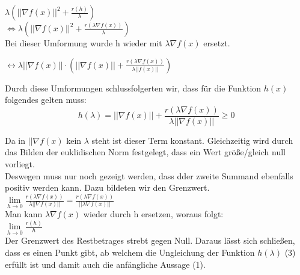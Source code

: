 $\lambda (||\nabla f(x)||^2 + \frac{r(h)}{\lambda})$ \\

$\Leftrightarrow \lambda(||\nabla f(x)||^2 + \frac{r(\lambda \nabla f(x))}{\lambda})$ \\

Bei dieser Umformung wurde h wieder mit $\lambda\nabla f(x)$ ersetzt.

$\leftrightarrow \lambda ||\nabla f(x)|| \cdot (||\nabla f(x)|| + \frac{r(\lambda \nabla f(x))}{\lambda || f(x)||})$


Durch diese Umformungen schlussfolgerten wir, dass f\"ur die Funktion $h(x)$ folgendes gelten muss:\\
\begin{equation} h(\lambda)=||\nabla f(x)|| + \frac{r(\lambda\nabla f(x))}{\lambda||\nabla f(x)||} \geq 0 \end{equation}


Da in $||\nabla f(x)$ kein $\lambda$ steht ist dieser Term konstant. Gleichzeitig wird durch das Bilden der euklidischen Norm festgelegt, dass ein Wert größe/gleich null vorliegt. \\ %
Deswegen muss nur noch gezeigt werden, dass dder zweite Summand ebenfalls positiv werden kann. Dazu bildeten wir den Grenzwert. \\ %
$\lim\limits_{h \rightarrow 0}{\frac{r(\lambda \nabla f(x))}{\lambda ||\nabla f(x)||}} = \frac{r(\lambda \nabla f(x))}{||\lambda  \nabla f(x)||}$ \\ %

Man kann $\lambda \nabla f(x)$ wieder durch h ersetzen, woraus folgt: \\
$\lim\limits_{h \rightarrow 0} \frac{r(h)}{h}$ \\

Der Grenzwert des Restbetrages strebt gegen Null. Daraus lässt sich schließen, dass es einen Punkt gibt, ab welchem die Ungleichung der Funktion $h(\lambda)$ (3) erfüllt ist und damit auch die anfängliche Aussage (1). \\ %
\vspace{15pt}

\vspace{15pt}


